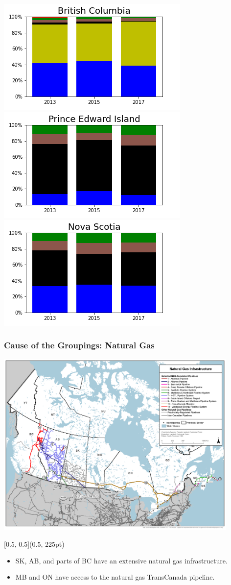\documentclass{beamer}
\begin{document}
\begin{frame}
\includegraphics[width=0.25\linewidth]{bc.png}%
\includegraphics[width=0.25\linewidth]{pe.png}%
\includegraphics[width=0.25\linewidth]{ns.png}


\end{frame}





\begin{frame}
\frametitle{Cause of the Groupings: Natural Gas}
\vspace{-40pt}
\begin{center}
\includegraphics[width=0.9\textwidth, trim={15pt 130pt 240pt 220pt}, clip]{natural_gas_pipeline_natural_resources_canada}
\end{center} 

\begin{textblock*}{\textwidth}[0.5, 0.5](0.5\linewidth, 225pt)
\begin{itemize}
	\item SK, AB, and parts of BC have an extensive natural gas infrastructure.
	\item MB and ON have access to the natural gas TransCanada pipeline.
\end{itemize}
\end{textblock*}
\end{frame}
\end{document}
